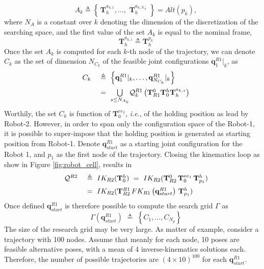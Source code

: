 \documentclass[twocolumn]{svjour3}
\newcommand{\R}[1]{R#1}
\newcommand{\RA}{\R{1}}
\newcommand{\RB}{\R{2}}
\newcommand{\qrA}{\mathbf{q}^{\RA}}
\newcommand{\qqrA}{\mathcal{Q}^{\RA}_{k}}
\newcommand{\qqrB}{\mathcal{Q}^{\RB}}
\newcommand{\Tr}[2]{\mathbf{T}^{#2}_{#1}}
\newcommand{\wbigcup}[1]{\underset{#1}{\bigcup}}
\begin{document}
\begin{equation}\label{eq:redundancy_fcn}
    \quad
    A_k \triangleq \left\{\,\Tr{h}{a_{k,1}},\ldots,\,\,\Tr{h}{a_{k,N_{A}}}\,\,\right\} = Alt\left(p_k\right),
\end{equation}
where $N_{A}$ is a constant over $k$ denoting the dimension of the discretization of the searching space, and the first value of the set $A_k$ is equal to the nominal frame,
\begin{equation*}
\quad\Tr{h}{a_{k,1}}\triangleq \Tr{h}{p_k}
\end{equation*}
Once the set $A_k$ is computed for each $k$-th node of the trajectory, we can denote $C_k$ as the set of dimension $N_{C_k}$ of the feasible joint configurations $\qrA_1|_k$,  as
\begin{equation}
\begin{array}{lll}\label{eq:ck}
\quad C_k & \,\,\triangleq \,\, \left\{\qrA_1|_k,\ldots,\qrA_{N_{C_k}}|_k\right\}\\ \vspace{-6pt}\\
    &\,\,=\,\,\wbigcup{ s \leq N_{A_k}} 
\qqrA \left( \Tr{\RA}{0}\Tr{0}{h}\Tr{h}{a_{k,s}}\right)
\end{array}
\end{equation}
Worthily, the set $C_k$ is function of $\Tr{0}{ee_2}$, \textit{i.e.}, of the holding position as lead by Robot-2. 
However, in order to span only the configuration space of the Robot-1, it is possible to super-impose that the holding position is generated as starting position from Robot-1. 
Denote $\qrA_{start}$ as a starting joint configuration for the Robot 1, and $p_1$ as the first node of the trajectory. Closing the kinematics loop as show in Figure \ref{fig:robot_cell}, results in
\begin{equation}\label{eq:WACO_start_point}
\begin{array}{ll}
\quad \qqrB\,\,& \triangleq\,\,IK_{\RB}( \Tr{0}{h} )\,\,=\,\,IK_{\RB}( \Tr{\RB}{0}\,\Tr{0}{ee_1}\,\Tr{p_1}{h} ) \\ \vspace{-6pt} \\
    & =\,\,IK_{\RB}(\Tr{\RB}{\RA} \, FK_{\RA}\left(\qrA_{start}\right)\,\Tr{p_1}{h} ) 
\end{array}
\end{equation}
%
Once defined $\qrA_{start}$ is therefore possible to compute the search grid $\Gamma$ as 
\begin{equation}\label{eq:search-grid}
\quad    \Gamma\left(\qrA_{start}\right)\,\,\triangleq\,\,\left\{C_1, \ldots, C_{N_p}\right\} 
\end{equation}
The size of the research grid may be very large. As matter of example, consider a trajectory with 100 nodes. Assume that meanly for each node, 10 poses are feasible alternative poses, with a mean of 4 inverse-kinematics solutions each. Therefore, the number of possible trajectories are $ (4 \times 10)^{100}$  for each $\qrA_{start}$.
\end{document}
